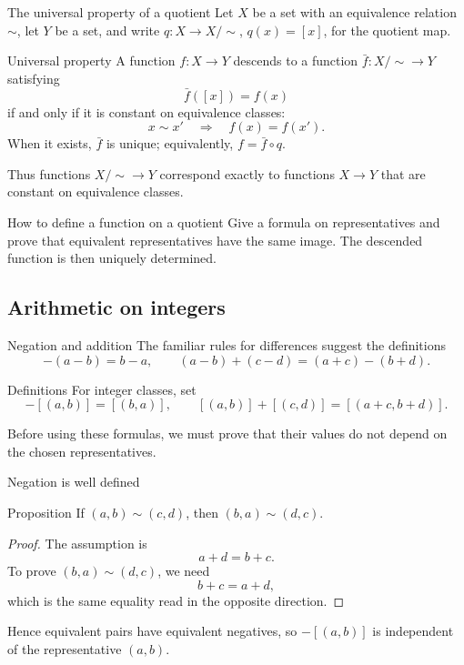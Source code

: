 \documentclass[aspectratio=169,11pt]{beamer}
\newcommand{\cl}[2]{\left[(#1,#2)\right]}
\begin{document}
\begin{frame}{The universal property of a quotient}
  \footnotesize
  Let \(X\) be a set with an equivalence relation \(\sim\), let \(Y\) be a
  set, and write \(q\colon X\to X/{\sim}\), \(q(x)=[x]\), for the quotient map.

  \begin{block}{Universal property}
    A function \(f\colon X\to Y\) descends to a function
    \(\bar f\colon X/{\sim}\to Y\) satisfying
    \[
      \bar f([x])=f(x)
    \]
    if and only if it is constant on equivalence classes:
    \[
      x\sim x'\quad\Longrightarrow\quad f(x)=f(x').
    \]
    When it exists, \(\bar f\) is unique; equivalently,
    \(f=\bar f\circ q\).
  \end{block}

  Thus functions \(X/{\sim}\to Y\) correspond exactly to functions
  \(X\to Y\) that are constant on equivalence classes.

  \begin{alertblock}{How to define a function on a quotient}
    Give a formula on representatives and prove that equivalent representatives
    have the same image.  The descended function is then uniquely determined.
  \end{alertblock}
\end{frame}

\subsection{Arithmetic on integers}

\begin{frame}{Negation and addition}
  The familiar rules for differences suggest the definitions
  \[
    -(a-b)=b-a,
    \qquad
    (a-b)+(c-d)=(a+c)-(b+d).
  \]

  \begin{block}{Definitions}
    For integer classes, set
    \[
      -\cl{a}{b}=\cl{b}{a},
      \qquad
      \cl{a}{b}+\cl{c}{d}=\cl{a+c}{b+d}.
    \]
  \end{block}

  Before using these formulas, we must prove that their values do not depend
  on the chosen representatives.
\end{frame}

\begin{frame}{Negation is well defined}
  \begin{block}{Proposition}
    If \((a,b)\sim(c,d)\), then \((b,a)\sim(d,c)\).
  \end{block}

  \begin{proof}
    The assumption is
    \[
      a+d=b+c.
    \]
    To prove \((b,a)\sim(d,c)\), we need
    \[
      b+c=a+d,
    \]
    which is the same equality read in the opposite direction.
  \end{proof}

  Hence equivalent pairs have equivalent negatives, so
  \(-\cl{a}{b}\) is independent of the representative \((a,b)\).
\end{frame}
\end{document}
